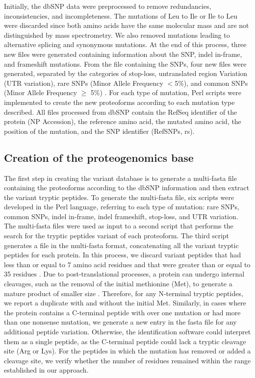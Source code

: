 \documentclass{ieeeaccess}
\begin{document}
Initially, the dbSNP data were preprocessed to remove redundancies, inconsistencies, and incompleteness. The mutations of Leu to Ile or Ile to Leu were discarded since both amino acids have the same molecular mass and are not distinguished by mass spectrometry. We also removed mutations leading to alternative splicing and synonymous mutations. At the end of this process, three new files were generated containing information about the SNP, indel in-frame, and frameshift mutations. From the file containing the SNPs, four new files were generated, separated by the categories of stop-loss, untranslated region Variation (UTR variation), rare SNPs (Minor Allele Frequency $<$5\%), and common SNPs (Minor Allele Frequency $\geq$ 5\%) \cite{International_HapMap_3_Consortium2010-eo}. For each type of mutation, Perl scripts were implemented to create the new proteoforms according to each mutation type described. All files processed from dbSNP contain the RefSeq identifier of the protein (NP Accession), the reference amino acid, the mutated amino acid, the position of the mutation, and the SNP identifier (RefSNPs, rs).

\subsection{Creation of the proteogenomics base}

The first step in creating the variant database is to generate a multi-fasta file containing the proteoforms according to the dbSNP information and then extract the variant tryptic peptides. To generate the multi-fasta file, six scripts were developed in the Perl language, referring to each type of mutation: rare SNPs, common SNPs, indel in-frame, indel frameshift, stop-loss, and UTR variation. The multi-fasta files were used as input to a second script that performs the search for the tryptic peptides variant of each proteoform. The third script generates a file in the multi-fasta format, concatenating all the variant tryptic peptides for each protein.
In this process, we discard variant peptides that had less than or equal to 7 amino acid residues and that were greater than or equal to 35 residues \cite{Fricker2015-eh}. Due to post-translational processes, a protein can undergo internal cleavages, such as the removal of the initial methionine (Met), to generate a mature product of smaller size \cite{Strachan2002-an}. Therefore, for any N-terminal tryptic peptides, we report a duplicate with and without the initial Met. Similarly, in cases where the protein contains a C-terminal peptide with over one mutation or had more than one nonsense mutation, we generate a new entry in the fasta file for any additional peptide variation. Otherwise, the identification software could interpret them as a single peptide, as the C-terminal peptide could lack a tryptic cleavage site (Arg or Lys). For the peptides in which the mutation has removed or added a cleavage site, we verify whether the number of residues remained within the range established in our approach.
\end{document}
